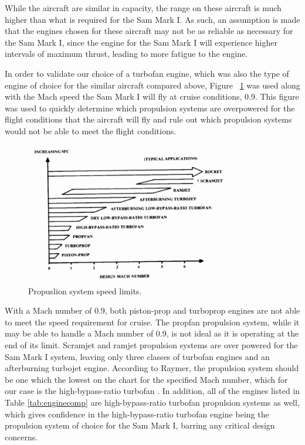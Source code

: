 While the aircraft are similar in capacity, the range on these aircraft is much higher than what is required for the Sam Mark I. As such, an assumption is made that the engines chosen for these aircraft may not be as reliable as necessary for the Sam Mark I, since the engine for the Sam Mark I will experience higher intervals of maximum thrust, leading to more fatigue to the engine. 

In order to validate our choice of a turbofan engine, which was also the type of engine of choice for the similar aircraft compared above, Figure ~\ref{PropSelection} was used along with the Mach speed the Sam Mark I will fly at cruise conditions, 0.9. This figure was used to quickly determine which propulsion systems are overpowered for the flight conditions that the aircraft will fly and rule out which propulsion systems would not be able to meet the flight conditions.

\begin{figure} [h!]
    \centering
    \includegraphics[width=0.8\textwidth]{Photos/PropSelection.PNG}
    \caption{Propuslion system speed limits. \cite{raymer}}
    \label{PropSelection}
\end{figure}

With a Mach number of 0.9, both piston-prop and turboprop engines are not able to meet the speed requirement for cruise. The propfan propulsion system, while it may be able to handle a Mach number of 0.9, is not ideal as it is operating at the end of its limit. Scramjet and ramjet propulsion systems are over powered for the Sam Mark I system, leaving only three classes of turbofan engines and an afterburning turbojet engine. According to Raymer, the propulsion system should be one which the lowest on the chart for the specified Mach number, which for our case is the high-bypass-ratio turbofan \cite{raymer}. In addition, all of the engines listed in Table \ref{tab:enginecomp} are high-bypass-ratio turbofan propulsion systems as well, which gives confidence in the high-bypass-ratio turbofan engine being the propulsion system of choice for the Sam Mark I, barring any critical design concerns.


